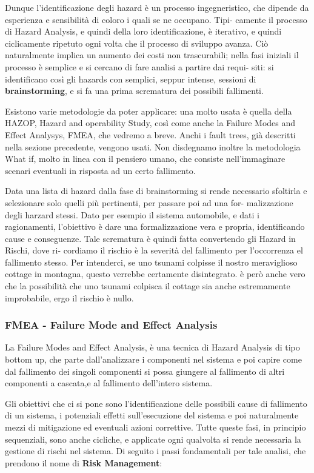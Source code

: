 \documentclass{article}
\begin{document}
Dunque l’identificazione degli hazard è un processo ingegneristico, che
dipende da esperienza e sensibilità di coloro i quali se ne occupano. Tipi-
camente il processo di Hazard Analysis, e quindi della loro identificazione, è
iterativo, e quindi ciclicamente ripetuto ogni volta che il processo di sviluppo
avanza.
Ciò naturalmente implica un aumento dei costi non trascurabili; nella fasi
iniziali il processo è semplice e si cercano di fare analisi a partire dai requi-
siti: si identificano così gli hazards con semplici, seppur intense, sessioni di
\textbf{brainstorming}, e si fa una prima scrematura dei possibili fallimenti.

Esistono varie metodologie da poter applicare: una molto usata è quella
della HAZOP, Hazard and operability Study, così come anche la Failure
Modes and Effect Analysys, FMEA, che vedremo a breve. Anchi i fault
trees, già descritti nella sezione precedente, vengono usati. Non disdegnamo
inoltre la metodologia What if, molto in linea con il pensiero umano, che
consiste nell’immaginare scenari eventuali in risposta ad un certo fallimento. 

Data una lista di hazard dalla fase di brainstorming si rende necessario
sfoltirla e selezionare solo quelli più pertinenti, per passare poi ad una for-
malizzazione degli harzard stessi. Dato per esempio il sistema automobile,
e dati i ragionamenti, l’obiettivo è dare una formalizzazione vera e propria,
identificando cause e conseguenze.
Tale scrematura è quindi fatta convertendo gli Hazard in Rischi, dove ri-
cordiamo il rischio è la severità del fallimento per l’occorrenza el fallimento
stesso. Per intenderci, se uno tsunami colpisse il nostro meraviglioso cottage
in montagna, questo verrebbe certamente disintegrato. è però anche vero
che la possibilità che uno tsunami colpisca il cottage sia anche estremamente
improbabile, ergo il rischio è nullo.

\subsubsection{FMEA - Failure Mode and Effect Analysis}
La Failure Modes and Effect Analysis, è una tecnica di Hazard Analysis di tipo bottom up,
che parte dall’analizzare i componenti nel sistema e poi capire come dal fallimento dei 
singoli componenti si possa giungere al fallimento di altri componenti a cascata,e al 
fallimento dell’intero sistema.

Gli obiettivi che ci si pone sono l’identificazione delle possibili cause di fallimento di
un sistema, i potenziali effetti sull’esecuzione del sistema e poi naturalmente mezzi di
mitigazione ed eventuali azioni correttive. Tutte queste fasi, in principio sequenziali, 
sono anche cicliche, e applicate ogni qualvolta si rende necessaria la gestione di rischi
nel sistema. Di seguito i passi fondamentali per tale analisi, che prendono il nome di
\textbf{Risk Management}:
\end{document}
